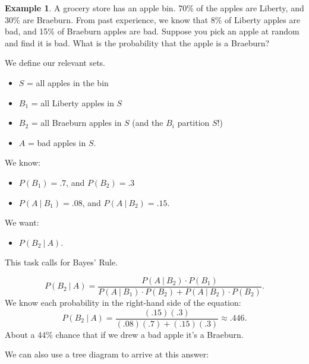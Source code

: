 \documentclass[
]{book}
\providecommand{\tightlist}{%
  \setlength{\itemsep}{0pt}\setlength{\parskip}{0pt}}
\theoremstyle{definition}
\theoremstyle{definition}
\newtheorem{example}{Example}[chapter]
\theoremstyle{definition}
\theoremstyle{definition}
\theoremstyle{remark}
\begin{document}
\begin{example}
\protect\hypertarget{exm:bad-apples}{}\label{exm:bad-apples}A grocery store has an apple bin. 70\% of the apples are Liberty, and 30\% are Braeburn. From past experience, we know that 8\% of Liberty apples are bad, and 15\% of Braeburn apples are bad. Suppose you pick an apple at random and find it is bad. What is the probability that the apple is a Braeburn?

We define our relevant sets.

\begin{itemize}
\tightlist
\item
  \(S\) = all apples in the bin
\item
  \(B_1\) = all Liberty apples in \(S\)
\item
  \(B_2\) = all Braeburn apples in \(S\) (and the \(B_i\) partition \(S\)!)
\item
  \(A\) = bad apples in \(S\).
\end{itemize}

We know:

\begin{itemize}
\tightlist
\item
  \(P(B_1) = .7\), and \(P(B_2) = .3\)
\item
  \(P(A~|~B_1) = .08\), and \(P(A~|~B_2) = .15\).
\end{itemize}

We want:

\begin{itemize}
\tightlist
\item
  \(P(B_2 ~|~ A)\).
\end{itemize}

This task calls for Bayes' Rule.

\[P(B_2~|~A) = \frac{P(A~|~B_2)\cdot P(B_1)}{P(A~|~B_1)\cdot P(B_2)+P(A~|~B_2)\cdot P(B_2)}.\]
We know each probability in the right-hand side of the equation:
\[P(B_2~|~A) = \frac{(.15)(.3)}{(.08)(.7)+(.15)(.3)} \approx .446.\]
About a 44\% chance that if we drew a bad apple it's a Braeburn.

We can also use a tree diagram to arrive at this answer:


\end{example}
\end{document}
